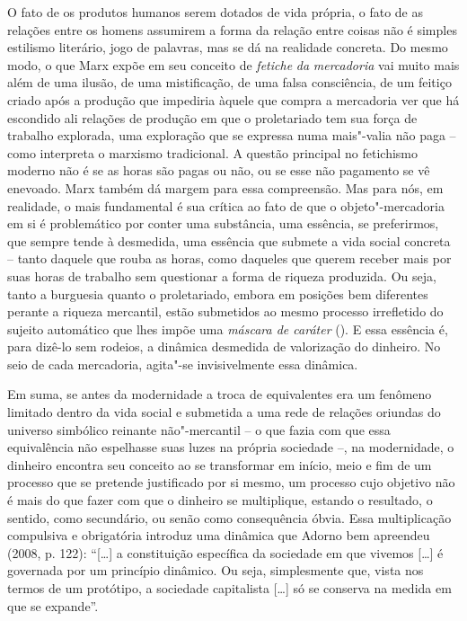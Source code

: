 O fato de os produtos humanos serem dotados de vida própria, o fato de
as relações entre os homens assumirem a forma da relação entre coisas
não é simples estilismo literário, jogo de palavras, mas se dá na
realidade concreta. Do mesmo modo, o que Marx expõe em seu conceito de
\emph{fetiche} \emph{da} \emph{mercadoria} vai muito mais além de uma
ilusão, de uma mistificação, de uma falsa consciência, de um feitiço
criado após a produção que impediria àquele que compra a mercadoria ver
que há escondido ali relações de produção em que o proletariado tem sua
força de trabalho explorada, uma exploração que se expressa numa
mais"-valia não paga -- como interpreta o marxismo tradicional. A questão
principal no fetichismo moderno não é se as horas são pagas ou não, ou
se esse não pagamento se vê enevoado. Marx também dá margem para essa
compreensão. Mas para nós, em realidade, o mais fundamental é sua
crítica ao fato de que o objeto"-mercadoria em si é problemático por
conter uma substância, uma essência, se preferirmos, que sempre tende à
desmedida, uma essência que submete a vida social concreta -- tanto
daquele que rouba as horas, como daqueles que querem receber mais por
suas horas de trabalho sem questionar a forma de riqueza produzida. Ou seja,
tanto a burguesia quanto o proletariado, embora em posições bem
diferentes perante a riqueza mercantil, estão submetidos ao mesmo
processo irrefletido do sujeito automático que lhes impõe uma
\emph{máscara de caráter} (). E essa essência é, para dizê-lo sem
rodeios, a dinâmica desmedida de valorização do dinheiro. No seio de
cada mercadoria, agita"-se invisivelmente essa dinâmica.

Em suma, se antes da modernidade a troca de equivalentes era um fenômeno
limitado dentro da vida social e submetida a uma rede de relações
oriundas do universo simbólico reinante não"-mercantil -- o que fazia com
que essa equivalência não espelhasse suas luzes na própria sociedade --,
na modernidade, o dinheiro encontra seu conceito ao se transformar em
início, meio e fim de um processo que se pretende justificado por si
mesmo, um processo cujo objetivo não é mais do que fazer com que o
dinheiro se multiplique, estando o resultado, o sentido, como
secundário, ou senão como consequência óbvia. Essa multiplicação
compulsiva e obrigatória introduz uma dinâmica que Adorno bem apreendeu
(2008, p. 122): ``[\ldots{}] a constituição específica da sociedade em
que vivemos [\ldots{}] é governada por um princípio dinâmico. Ou seja,
simplesmente que, vista nos termos de um protótipo, a sociedade
capitalista [\ldots{}] só se conserva na medida em que se expande''.

